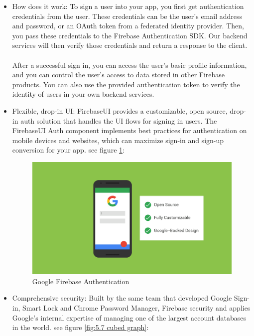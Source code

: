 \begin{itemize}
\item  How does it work: To sign a user into your app, you first get authentication credentials from the user. These credentials can be the user's email address and password, or an OAuth token from a federated identity provider. Then, you pass these credentials to the Firebase Authentication SDK. Our backend services will then verify those credentials and return a response to the client. \\ \\ After a successful sign in, you can access the user's basic profile information, and you can control the user's access to data stored in other Firebase products. You can also use the provided authentication token to verify the identity of users in your own backend services\cite{3}.
\item Flexible, drop-in UI: FirebaseUI provides a customizable, open source, drop-in auth solution that handles the UI flows for signing in users. The FirebaseUI Auth component implements best practices for authentication on mobile devices and websites, which can maximize sign-in and sign-up conversion for your app\cite{4}. see figure \ref{fig:5.6 cubed graph}:
\begin{figure}[h]
	\centering
	\includegraphics[scale=0.3]{img/firebaseauth1.png}
	\caption{Google Firebase Authentication}
	\label{fig:5.6 cubed graph}
\end{figure}
\item Comprehensive security: Built by the same team that developed Google Sign-in, Smart Lock and Chrome Password Manager, Firebase security and applies Google's internal expertise of managing one of the largest account databases in the world. see figure \ref{fig:5.7 cubed graph}:
\begin{figure}[h]

\end{figure}
\end{itemize}
